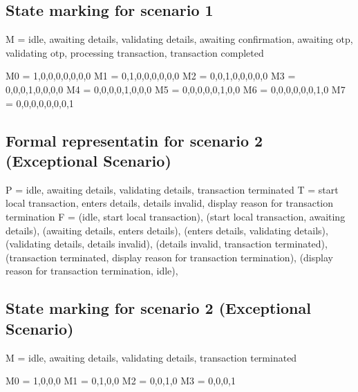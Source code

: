 \documentclass[a4paper]{report}
\begin{document}
\subsection{State marking for scenario 1}

M = {idle, awaiting details, validating details, awaiting confirmation, awaiting otp, validating otp, processing transaction, transaction completed}
\newline

M0 = {1,0,0,0,0,0,0,0}
\newline
M1 = {0,1,0,0,0,0,0,0}
\newline
M2 = {0,0,1,0,0,0,0,0}
\newline
M3 = {0,0,0,1,0,0,0,0}
\newline
M4 = {0,0,0,0,1,0,0,0}
\newline
M5 = {0,0,0,0,0,1,0,0}
\newline
M6 = {0,0,0,0,0,0,1,0}
\newline
M7 = {0,0,0,0,0,0,0,1}
\newline

\subsection{Formal representatin for scenario 2 (Exceptional Scenario)}

P = {idle, awaiting details, validating details, transaction terminated}
\newline
T = {start local transaction, enters details, details invalid, display reason for transaction termination}
\newline
F = {
(idle, start local transaction),
(start local transaction, awaiting details),
(awaiting details, enters details),
(enters details, validating details),
(validating details, details invalid),
(details invalid, transaction terminated),
(transaction terminated, display reason for transaction termination),
(display reason for transaction termination, idle),
}
\newline

\subsection{State marking for scenario 2 (Exceptional Scenario)}

M = {idle, awaiting details, validating details, transaction terminated}
\newline

M0 = {1,0,0,0}
\newline
M1 = {0,1,0,0}
\newline
M2 = {0,0,1,0}
\newline
M3 = {0,0,0,1}
\end{document}
